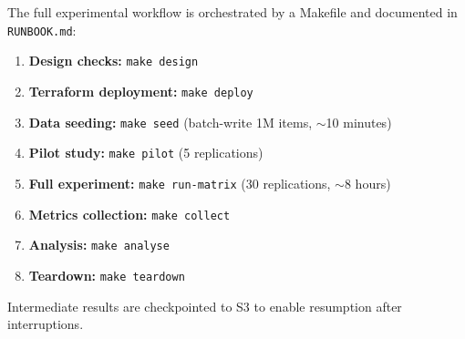 The full experimental workflow is orchestrated by a Makefile and documented in \texttt{RUNBOOK.md}:

\begin{enumerate}
    \item \textbf{Design checks:} \texttt{make design}
    \item \textbf{Terraform deployment:} \texttt{make deploy}
    \item \textbf{Data seeding:} \texttt{make seed} (batch-write 1M items, $\sim$10 minutes)
    \item \textbf{Pilot study:} \texttt{make pilot} (5 replications)
    \item \textbf{Full experiment:} \texttt{make run-matrix} (30 replications, $\sim$8 hours)
    \item \textbf{Metrics collection:} \texttt{make collect}
    \item \textbf{Analysis:} \texttt{make analyse}
    \item \textbf{Teardown:} \texttt{make teardown}
\end{enumerate}

Intermediate results are checkpointed to S3 to enable resumption after interruptions.
